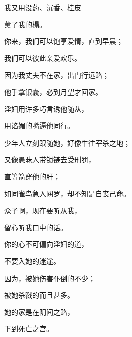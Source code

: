{\par }{\Q {}我又用没药、沉香、桂皮
\par }{\Q 薰了我的榻。
\par }{\Q {}你来，我们可以饱享爱情，直到早晨；
\par }{\Q 我们可以彼此亲爱欢乐。
\par }{\Q {}因为我丈夫不在家，出门行远路；
\par }{\Q {}他手拿银囊，必到月望才回家。
\par }{\BB \par }{\Q {}淫妇用许多巧言诱他随从，
\par }{\Q 用谄媚的嘴逼他同行。
\par }{\Q {}少年人立刻跟随她，好像牛往宰杀之地；
\par }{\Q 又像愚昧人带锁链去受刑罚，
\par }{\Q {}直等箭穿他的肝；
\par }{\Q 如同雀鸟急入网罗，却不知是自丧己命。
\par }{\BB \par }{\Q {}众子啊，现在要听从我，
\par }{\Q 留心听我口中的话。
\par }{\Q {}你的心不可偏向淫妇的道，
\par }{\Q 不要入她的迷途。
\par }{\Q {}因为，被她伤害仆倒的不少；
\par }{\Q 被她杀戮的而且甚多。
\par }{\Q {}她的家是在阴间之路，
\par }{\Q 下到死亡之宫。

}
